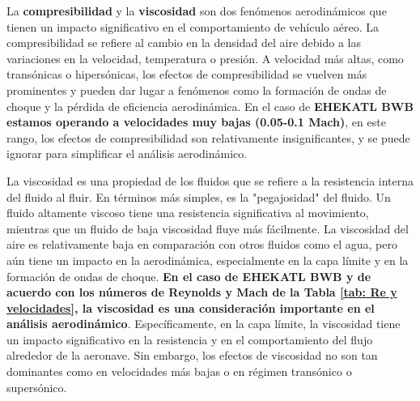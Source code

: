 La \textbf{compresibilidad} y la \textbf{viscosidad} son dos fenómenos aerodinámicos que tienen un impacto significativo en el comportamiento de vehículo aéreo.
%
La compresibilidad se refiere al cambio en la densidad del aire debido a las variaciones en la velocidad, temperatura o presión. A velocidad más altas, 
 como transónicas o hipersónicas, los efectos de compresibilidad se vuelven más prominentes y pueden dar lugar a fenómenos como la formación de ondas de choque y la pérdida de eficiencia aerodinámica. 
En el caso de \textbf{EHEKATL BWB estamos operando a velocidades muy bajas (0.05-0.1 Mach)}, en este rango, los efectos de compresibilidad son relativamente insignificantes, y se puede ignorar para simplificar el análisis aerodinámico. 

La viscosidad es una propiedad de los fluidos que se refiere a la resistencia interna del fluido al fluir. En términos más simples, es la "pegajosidad" del fluido. Un fluido altamente viscoso tiene una resistencia significativa al movimiento, mientras que un fluido de baja viscosidad fluye más fácilmente. La viscosidad del aire es relativamente baja en comparación con otros fluidos como el agua, pero aún tiene un impacto en la aerodinámica, especialmente en la capa límite y en la formación de ondas de choque. 
\textbf{En el caso de EHEKATL BWB y de acuerdo con los números de Reynolds y Mach de la Tabla \ref{tab: Re y velocidades}, la viscosidad es una consideración importante en el análisis aerodinámico}. Específicamente, en la capa límite, la viscosidad tiene un impacto significativo en la resistencia y en el comportamiento del flujo alrededor de la aeronave. Sin embargo, los efectos de viscosidad no son tan dominantes como en velocidades más bajas o en régimen transónico o supersónico. 


